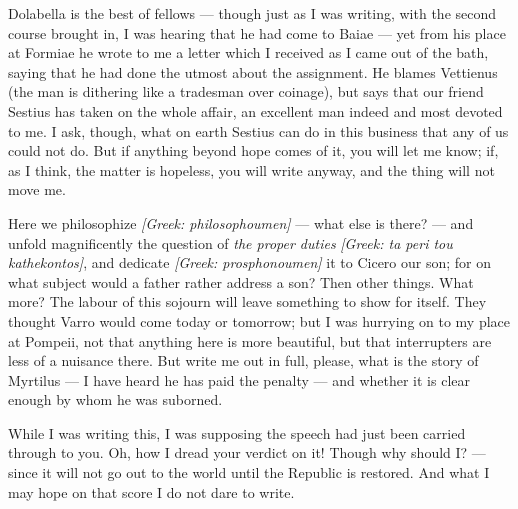  Dolabella is the best of fellows --- though just as I was writing, with the second course brought in, I was hearing that he had come to Baiae --- yet from his place at Formiae he wrote to me a letter which I received as I came out of the bath, saying that he had done the utmost about the assignment. He blames Vettienus (the man is dithering like a tradesman over coinage), but says that our friend Sestius has taken on the whole affair, an excellent man indeed and most devoted to me. I ask, though, what on earth Sestius can do in this business that any of us could not do. But if anything beyond hope comes of it, you will let me know; if, as I think, the matter is hopeless, you will write anyway, and the thing will not move me.

 Here we philosophize \textit{[Greek: philosophoumen]} --- what else is there? --- and unfold magnificently the question of \textit{the proper duties} \textit{[Greek: ta peri tou kathekontos]}, and dedicate \textit{[Greek: prosphonoumen]} it to Cicero our son; for on what subject would a father rather address a son? Then other things. What more? The labour of this sojourn will leave something to show for itself. They thought Varro would come today or tomorrow; but I was hurrying on to my place at Pompeii, not that anything here is more beautiful, but that interrupters are less of a nuisance there. But write me out in full, please, what is the story of Myrtilus --- I have heard he has paid the penalty --- and whether it is clear enough by whom he was suborned.

 While I was writing this, I was supposing the speech had just been carried through to you. Oh, how I dread your verdict on it! Though why should I? --- since it will not go out to the world until the Republic is restored. And what I may hope on that score I do not dare to write.
